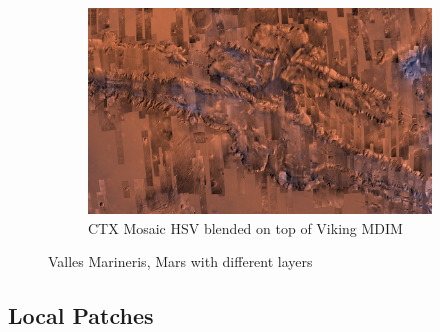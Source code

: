 \begin{figure}[h]
\begin{subfigure}[bt]{0.90\textwidth}
        \includegraphics[width=\textwidth]{figures/results/screenshots_thesis_old/valles_marineris3.jpg}
        \caption{CTX Mosaic HSV blended on top of Viking MDIM}
    \end{subfigure}
    \caption{Valles Marineris, Mars with different layers}
    \label{fig:hsvblending}
\end{figure}

\clearpage
\subsection{Local Patches}
\label{section:localpatchesresult}
\FloatBarrier

